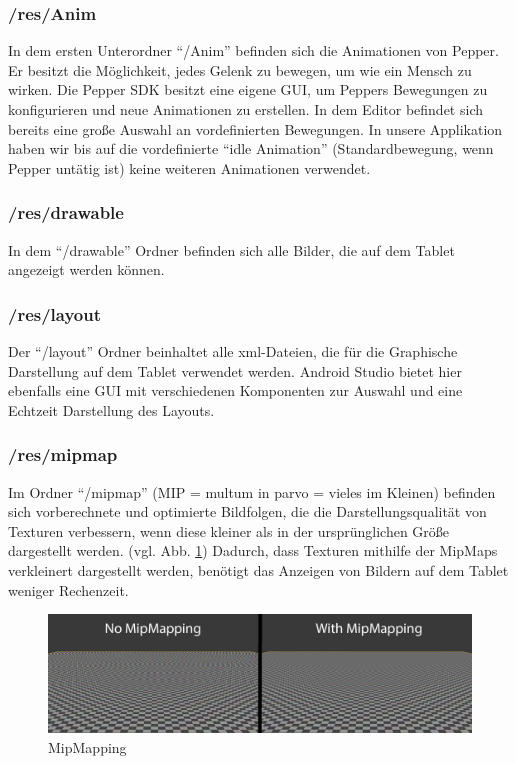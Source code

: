 \subsubsection*{/res/Anim}
In dem ersten Unterordner ``/Anim'' befinden sich die Animationen von Pepper. Er besitzt die Möglichkeit, jedes Gelenk zu bewegen, 
um wie ein Mensch zu wirken. Die Pepper SDK besitzt eine eigene GUI, um Peppers Bewegungen zu konfigurieren und neue Animationen zu erstellen. 
In dem Editor befindet sich bereits eine große Auswahl an vordefinierten Bewegungen. In unsere Applikation haben wir bis auf die vordefinierte 
``idle Animation''  (Standardbewegung, wenn Pepper untätig ist) keine weiteren Animationen verwendet. \\

\subsubsection*{/res/drawable}
In dem ``/drawable'' Ordner befinden sich alle Bilder, die auf dem Tablet angezeigt werden können.\\

\subsubsection*{/res/layout}
Der ``/layout'' Ordner beinhaltet alle xml-Dateien, die für die Graphische Darstellung auf dem Tablet verwendet werden. Android 
Studio bietet hier ebenfalls eine GUI mit verschiedenen Komponenten zur Auswahl und eine Echtzeit Darstellung des Layouts. \\

\subsubsection*{/res/mipmap}
Im Ordner ``/mipmap'' (MIP = multum in parvo = vieles im Kleinen) befinden sich vorberechnete und optimierte Bildfolgen, die die 
Darstellungsqualität von Texturen verbessern, wenn diese kleiner als in der ursprünglichen Größe dargestellt werden. (vgl. Abb. \ref{fig:MipMap})
Dadurch, dass Texturen mithilfe der MipMaps verkleinert dargestellt werden, benötigt das Anzeigen von Bildern auf dem Tablet weniger Rechenzeit.
\cite{MipMaps}\\

\begin{figure}[H]
    \includegraphics[width=\textwidth]{Figures/AppChapter/4_1_2.png}
    \caption{MipMapping \cite{mimappng}}
    \label{fig:MipMap}
    \centering
\end{figure}

